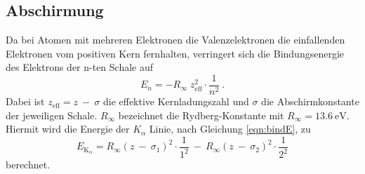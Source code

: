\subsection{Abschirmung}
Da bei Atomen mit mehreren Elektronen die Valenzelektronen die einfallenden
Elektronen vom positiven Kern fernhalten, verringert sich die Bindungsenergie
des Elektrons der n-ten Schale auf
\begin{equation}
  E_n = -R_\infty\: z_\text{eff}^2 \cdot \frac{1}{n^2}\:.
  \label{eqn:bindE}
\end{equation}
Dabei ist $z_\text{eff} = z\:-\:σ$ die effektive Kernladungszahl und $σ$
die Abschirmkonstante der jeweiligen Schale. $R_\infty$ bezeichnet die Rydberg-Konstante mit
$R_\infty = \SI{13.6}{\electronvolt}$.
\\
Hiermit wird die Energie der $K_α$ Linie, nach Gleichung \eqref{eqn:bindE}, zu
\begin{equation}
  E_{\text{K}_α} = R_\infty \left( z\:-\:σ_1 \right)^2 \cdot \frac{1}{1^2}\:-\:
                 R_\infty \left( z\:-\:σ_2 \right)^2 \cdot \frac{1}{2^2}
  \label{eqn:kalpha}
\end{equation}
berechnet.
\\
